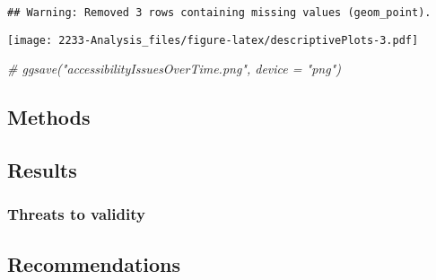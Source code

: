 \documentclass[
]{article}
\newenvironment{Shaded}{\begin{snugshade}}{\end{snugshade}}
\newcommand{\CommentTok}[1]{\textcolor[rgb]{0.56,0.35,0.01}{\textit{#1}}}
\begin{document}
\begin{verbatim}
## Warning: Removed 3 rows containing missing values (geom_point).
\end{verbatim}

\texttt{[image: 2233-Analysis\_files/figure-latex/descriptivePlots-3.pdf]}

\begin{Shaded}
\begin{Highlighting}[]
\CommentTok{\# ggsave("accessibilityIssuesOverTime.png", device = "png")}
\end{Highlighting}
\end{Shaded}

\hypertarget{methods}{%
\subsection{Methods}\label{methods}}

\hypertarget{results}{%
\subsection{Results}\label{results}}

\hypertarget{threats-to-validity}{%
\subsubsection{Threats to validity}\label{threats-to-validity}}

\hypertarget{recommendations}{%
\subsection{Recommendations}\label{recommendations}}
\end{document}
